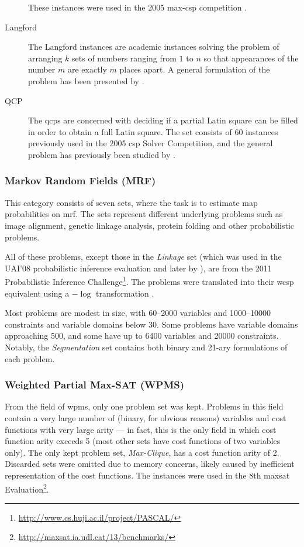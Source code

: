 \begin{description}
		These instances were used in the 2005 max-\gls{csp} competition \parencite{Boussemart05}.
	\item[Langford]
		The Langford instances are academic instances solving the problem of arranging \(k\) sets of numbers ranging from \(1\) to \(n\) so that appearances of the number \(m\) are exactly \(m\) places apart.
		A general formulation of the problem has been presented by \textcite{Linek03}.
	\item[QCP]
		The \glspl{qcp} are concerned with deciding if a partial Latin square can be filled in order to obtain a full Latin square.
		The set consists of 60 instances previously used in the 2005 \gls{csp} Solver Competition, and the general problem has previously been studied by \textcite{Gomes02}.
\end{description}

\subsubsection{Markov Random Fields (MRF)}
This category consists of seven sets, where the task is to estimate \gls{map} probabilities on \gls{mrf}. The sets represent different underlying problems such as image alignment, genetic linkage analysis, protein folding and other probabilistic problems.

All of these problems, except those in the \emph{Linkage} set (which was used in the UAI'08 probabilistic inference evaluation and later by \textcites{Favier11}{Kishimoto13}), are from the 2011 Probabilistic Inference Challenge\footnote{\url{http://www.cs.huji.ac.il/project/PASCAL/}}.
The problems were translated into their \gls{wcsp} equivalent using a \(-\log{}\) transformation \parencite[\pno~4]{deGivry14}.

Most problems are modest in size, with \numrange{60}{2000} variables and \numrange{1000}{10000} constraints and variable domains below \num{30}.
Some problems have variable domains approaching \num{500}, and some have up to \num{6400} variables and \num{20000} constraints.
Notably, the \emph{Segmentation} set contains both binary and 21-ary formulations of each problem.

\subsubsection{Weighted Partial Max-SAT (WPMS)}
From the field of \gls{wpms}, only one problem set was kept.
Problems in this field contain a very large number of (binary, for obvious reasons) variables and cost functions with very large arity --- in fact, this is the only field in which cost function arity exceeds \num{5} (most other sets have cost functions of two variables only).
The only kept problem set, \emph{Max-Clique}, has a cost function arity of \num{2}.
Discarded sets were omitted due to memory concerns, likely caused by inefficient representation of the cost functions.
The instances were used in the 8th \Gls{maxsat} Evaluation\footnote{\url{http://maxsat.ia.udl.cat/13/benchmarks/}}.

